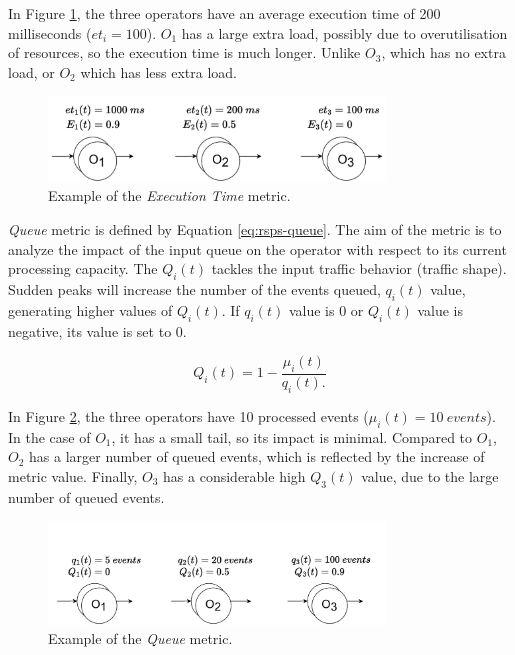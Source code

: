 In Figure \ref{fig:rsps-metric-e}, the three operators have an average execution time of 200 milliseconds ($et_i=100$). $O_1$ has a large extra load, possibly due to overutilisation of resources, so the execution time is much longer. Unlike $O_3$, which has no extra load, or $O_2$ which has less extra load.

\begin{figure}[!ht]
    \centering
    \includegraphics[width=0.8\textwidth]{figures/concepts/RA-SPS-Metric-E.pdf}
    \caption{Example of the \textit{Execution Time} metric.}
    \label{fig:rsps-metric-e}
\end{figure}

\textit{Queue} metric is defined by Equation \ref{eq:rsps-queue}. The aim of the metric is to analyze the impact of the input queue on the operator with respect to its current processing capacity. The $Q_i(t)$ tackles the input traffic behavior (traffic shape). Sudden peaks will increase the number of the events queued, $q_i(t)$ value, generating higher values of $Q_i(t)$. If $q_i(t)$ value is 0 or $Q_i(t)$ value is negative, its value is set to 0.

\begin{equation}
        Q_i(t) = 1-\frac{\mu_i(t)}{q_i(t).}
\label{eq:rsps-queue}
\end{equation}

In Figure \ref{fig:rsps-metric-q}, the three operators have 10 processed events ($\mu_i(t)=10~events$). In the case of $O_1$, it has a small tail, so its impact is minimal. Compared to $O_1$, $O_2$ has a larger number of queued events, which is reflected by the increase of metric value. Finally, $O_3$ has a considerable high $Q_{3}(t)$ value, due to the large number of queued events.

\begin{figure}[!ht]
    \centering
    \includegraphics[width=0.8\textwidth]{figures/concepts/RA-SPS-Metric-Q.pdf}
    \caption{Example of the \textit{Queue} metric.}
    \label{fig:rsps-metric-q}
\end{figure}

